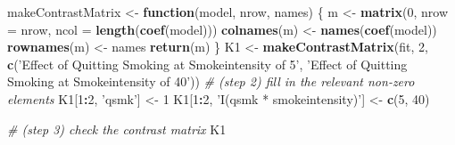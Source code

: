 \documentclass[10pt,]{book}
\newenvironment{Shaded}{\begin{snugshade}}{\end{snugshade}}
\newcommand{\CommentTok}[1]{\textcolor[rgb]{0.56,0.35,0.01}{\textit{#1}}}
\newcommand{\ControlFlowTok}[1]{\textcolor[rgb]{0.13,0.29,0.53}{\textbf{#1}}}
\newcommand{\DataTypeTok}[1]{\textcolor[rgb]{0.13,0.29,0.53}{#1}}
\newcommand{\DecValTok}[1]{\textcolor[rgb]{0.00,0.00,0.81}{#1}}
\newcommand{\KeywordTok}[1]{\textcolor[rgb]{0.13,0.29,0.53}{\textbf{#1}}}
\newcommand{\NormalTok}[1]{#1}
\newcommand{\OperatorTok}[1]{\textcolor[rgb]{0.81,0.36,0.00}{\textbf{#1}}}
\newcommand{\StringTok}[1]{\textcolor[rgb]{0.31,0.60,0.02}{#1}}
\begin{document}
\begin{Shaded}
\begin{Highlighting}[]
\NormalTok{makeContrastMatrix <-}\StringTok{ }\ControlFlowTok{function}\NormalTok{(model, nrow, names) \{}
\NormalTok{  m <-}\StringTok{ }\KeywordTok{matrix}\NormalTok{(}\DecValTok{0}\NormalTok{, }\DataTypeTok{nrow =}\NormalTok{ nrow, }\DataTypeTok{ncol =} \KeywordTok{length}\NormalTok{(}\KeywordTok{coef}\NormalTok{(model)))}
  \KeywordTok{colnames}\NormalTok{(m) <-}\StringTok{ }\KeywordTok{names}\NormalTok{(}\KeywordTok{coef}\NormalTok{(model))}
  \KeywordTok{rownames}\NormalTok{(m) <-}\StringTok{ }\NormalTok{names}
  \KeywordTok{return}\NormalTok{(m)}
\NormalTok{\}}
\NormalTok{K1 <-}\StringTok{ }\KeywordTok{makeContrastMatrix}\NormalTok{(fit, }\DecValTok{2}\NormalTok{, }\KeywordTok{c}\NormalTok{(}\StringTok{'Effect of Quitting Smoking at Smokeintensity of 5'}\NormalTok{,}
                                      \StringTok{'Effect of Quitting Smoking at Smokeintensity of 40'}\NormalTok{))}
\CommentTok{# (step 2) fill in the relevant non-zero elements }
\NormalTok{K1[}\DecValTok{1}\OperatorTok{:}\DecValTok{2}\NormalTok{, }\StringTok{'qsmk'}\NormalTok{] <-}\StringTok{ }\DecValTok{1}
\NormalTok{K1[}\DecValTok{1}\OperatorTok{:}\DecValTok{2}\NormalTok{, }\StringTok{'I(qsmk * smokeintensity)'}\NormalTok{] <-}\StringTok{ }\KeywordTok{c}\NormalTok{(}\DecValTok{5}\NormalTok{, }\DecValTok{40}\NormalTok{)}

\CommentTok{# (step 3) check the contrast matrix}
\NormalTok{K1 }
\end{Highlighting}
\end{Shaded}
\end{document}
